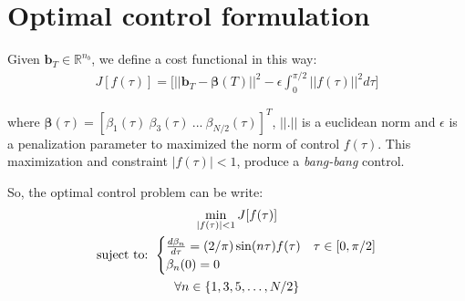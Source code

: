 


\section{Optimal control formulation}

\begin{problem}
    Given  $\bm{b}_T  \in \mathbb{R}^{n_b}$, we define a cost functional in this way: 
        \begin{gather}
        J[f(\tau)] = \Bigg[ || \bm{b}_T - \bm{\beta}(T)||^2 - \epsilon \int_0^{\pi/2} ||f(\tau)||^2 d\tau \Bigg] 
    \end{gather}

    where $ \bm{\beta}(\tau) = [\beta_1(\tau) \ \beta_3(\tau)  \ ... \  \beta_{N/2}(\tau) ]^T$, $||.||$ is a euclidean norm and $\epsilon$ is a penalization parameter to maximized the norm of control $f(\tau)$. This maximization and constraint $|f(\tau)|<1$, produce a \emph{bang-bang} control.
    \newline

    So, the optimal control problem can be write: 
    \begin{gather}
        \min_{|f(\tau) |<1} J[f(\tau)] \\
        \text{suject to: }
        \begin{cases}
            \frac{d\beta_n}{d\tau} = (2/\pi) \sin(n\tau) f(\tau) & \tau \in [0,\pi/2]\label{dyn}\\
            \beta_n(0) = 0
        \end{cases} \\
        \notag \forall n \in \{1,3,5,\dots,N/2 \}
    \end{gather}
\end{problem}

